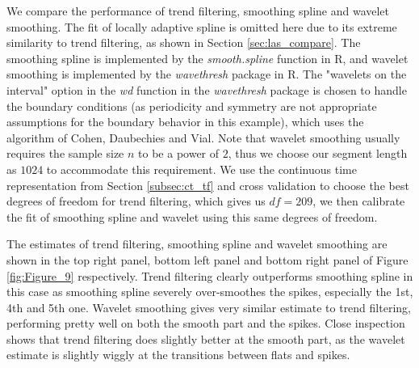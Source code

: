 \documentclass[a4paper]{article}
\begin{document}
We compare the performance of trend filtering, smoothing spline and wavelet smoothing. The fit of locally adaptive spline is omitted here due to its extreme similarity to trend filtering, as shown in Section \ref{sec:las_compare}. The smoothing spline is implemented by the \textit{smooth.spline} function in R, and wavelet smoothing is implemented by the \textit{wavethresh} package in R. The "wavelets on the interval" option in the \textit{wd} function in the \textit{wavethresh} package is chosen to handle the boundary conditions (as periodicity and symmetry are not appropriate assumptions for the boundary behavior in this example), which uses the algorithm of Cohen, Daubechies and Vial\cite{cohen1993wavelets}. Note that wavelet smoothing usually requires the sample size $n$ to be a power of $2$, thus we choose our segment length as $1024$ to accommodate this requirement. We use the continuous time representation from Section \ref{subsec:ct_tf} and cross validation to choose the best degrees of freedom for trend filtering, which gives us $df = 209$, we then calibrate the fit of smoothing spline and wavelet using this same degrees of freedom.

The estimates of trend filtering, smoothing spline and wavelet smoothing are shown in the top right panel, bottom left panel and bottom right panel of Figure \ref{fig:Figure_9} respectively. Trend filtering clearly outperforms smoothing spline in this case as smoothing spline severely over-smoothes the spikes, especially the 1st, 4th and 5th one. Wavelet smoothing gives very similar estimate to trend filtering, performing pretty well on both the smooth part and the spikes. Close inspection shows that trend filtering does slightly better at the smooth part, as the wavelet estimate is slightly wiggly at the transitions between flats and spikes.


\end{document}
